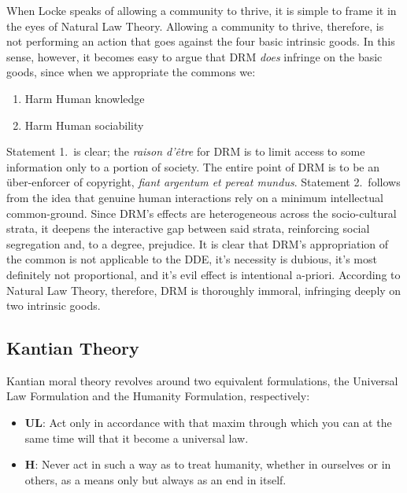 \documentclass[12pt,letterpaper]{article}
\begin{document}
When Locke speaks of allowing a community to thrive\autocite[\pno~119]{favale-2014}, it is simple to frame it in the eyes of Natural Law Theory. Allowing a community to thrive, therefore, is not performing an action that goes against the four basic intrinsic goods. In this sense, however, it becomes easy to argue that DRM \emph{does} infringe on the basic goods, since when we appropriate the commons we:

\begin{enumerate}
    \item Harm Human knowledge
    \item Harm Human sociability
\end{enumerate}

Statement 1.\ is clear; the \emph{raison d'être} for DRM is to limit access to some information only to a portion of society. The entire point of DRM is to be an über-enforcer of copyright, \emph{fiant argentum et pereat mundus}.
Statement 2.\ follows from the idea that genuine human interactions rely on a minimum intellectual common-ground. Since DRM's effects are heterogeneous across the socio-cultural strata, it deepens the interactive gap between said strata, reinforcing social
segregation and, to a degree, prejudice. It is clear that DRM's appropriation of the common is not applicable to the DDE, it's necessity is dubious, it's most definitely not proportional, and it's evil effect is intentional a-priori. According to Natural Law Theory, therefore, DRM is thoroughly immoral, infringing deeply on two intrinsic goods.

\subsection{Kantian Theory}
Kantian moral theory revolves around two equivalent formulations, the Universal Law Formulation and the Humanity Formulation, respectively:
\begin{itemize}
    \item \textbf{UL}: Act only in accordance with that maxim through which you can at the same time will that it become a universal law.\autocite{sep-kant-moral}
    \item \textbf{H}: Never act in such a way as to treat humanity, whether in ourselves or in others, as a means only but always as an end in itself.\autocite{sep-kant-moral}
\end{itemize}
\end{document}
